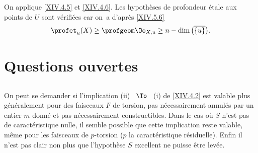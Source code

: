 On applique \ref{XIV.4.5} et \ref{XIV.4.6}. Les hypoth\`eses de profondeur \'etale aux points de $U$ sont v\'erifi\'ees car on~a d'apr\`es \ref{XIV.5.6} $$
\profet_{u}(X)\geq\profgeom\Oo_{X, u}\geq n-\dim\big(\overline{\{ u\} }\big).
$$

\enlargethispage{\baselineskip}%
\section{Questions ouvertes} \label{XIV.6}

\subsection{} \label{XIV.6.1} On peut se demander si l'implication \textup{(ii)} ~$\To$~ \textup{(i)} de \ref{XIV.4.2} est valable plus g\'en\'eralement pour des faisceaux $F$ de torsion, pas n\'ecessairement annul\'es par un entier $m$ donn\'e et pas n\'ecessairement constructibles. Dans le cas o\`u $S$ n'est pas de caract\'eristique nulle, il semble possible que cette implication reste valable, m\^eme pour les faisceaux de $p$-torsion ($p$ la caract\'eristique r\'esiduelle). Enfin il n'est pas clair non plus que l'hypoth\`ese $S$ excellent ne puisse \^etre lev\'ee.


